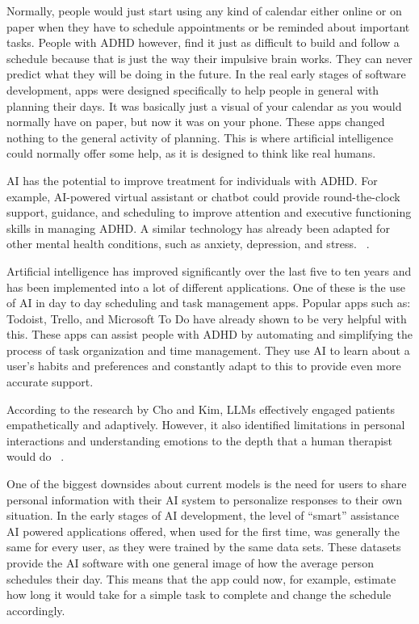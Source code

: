 \documentclass[english]{hogent-article}
\begin{document}
Normally, people would just start using any kind of calendar either online or on paper when they have to schedule appointments or be reminded about important tasks. People with ADHD however, find it just as difficult to build and follow a schedule because that is just the way their impulsive brain works. They can never predict what they will be doing in the future. In the real early stages of software development, apps were designed specifically to help people in general with planning their days. It was basically just a visual of your calendar as you would normally have on paper, but now it was on your phone. These apps changed nothing to the general activity of planning. This is where artificial intelligence could normally offer some help, as it is designed to think like real humans. 

AI has the potential to improve treatment for individuals with ADHD. For example, AI-powered virtual assistant or chatbot could provide round-the-clock support, guidance, and scheduling to improve attention and executive functioning skills in managing ADHD. A similar technology has already been adapted for other mental health conditions, such as anxiety, depression, and stress. ~\autocite{Rahman2023}.

Artificial intelligence has improved significantly over the last five to ten years and has been implemented into a lot of different applications. One of these is the use of AI in day to day scheduling and task management apps. Popular apps such as: Todoist, Trello, and Microsoft To Do have already shown to be very helpful with this. These apps can assist people with ADHD by automating and simplifying the process of task organization and time management. They use AI to learn about a user’s habits and preferences and constantly adapt to this to provide even more accurate support. 

According to the research by Cho and Kim, LLMs effectively engaged patients empathetically and adaptively. However, it also identified limitations in personal interactions and understanding emotions to the depth that a human therapist would do ~\autocite{Berrezueta-Guzman2024}.

One of the biggest downsides about current models is the need for users to share personal information with their AI system to personalize responses to their own situation. In the early stages of AI development, the level of “smart” assistance AI powered applications offered, when used for the first time, was generally the same for every user, as they were trained by the same data sets. These datasets provide the AI software with one general image of how the average person schedules their day. This means that the app could now, for example, estimate how long it would take for a simple task to complete and change the schedule accordingly.
\end{document}
